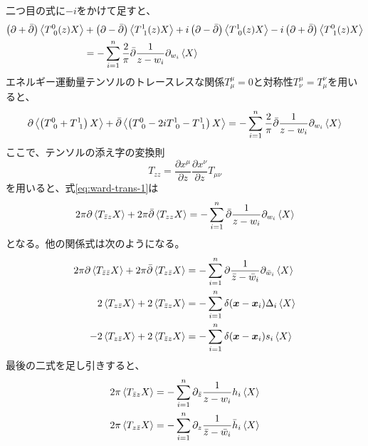 \documentclass[11pt, aps, longbibliography]{article}
\numberwithin{equation}{section}
\begin{document}
        二つ目の式に$-i$をかけて足すと、
        \begin{align}
            \left( \partial + \bar{\partial}\right) \expval{T^0_{\  0}(z)X} &+ \left( \partial - \bar{\partial}\right) \expval{T^1_{\ 1}(z)X} + i\left(  \partial - \bar{\partial}\right)  \expval{T^1_{\  0}(z)X} -i\left(  \partial + \bar{\partial}\right) \expval{T^0_{\  1}(z)X}  \notag \\
            &= -\sum_{i=1}^{n} \frac{2}{\pi} \bar{\partial} \frac{1}{z-w_i} \partial_{w_i} \expval{X}
        \end{align}
        エネルギー運動量テンソルのトレースレスな関係$T^\mu_\mu = 0$と対称性$T^\mu_\nu = T^\nu_\mu$を用いると、
        \begin{equation}\label{eq:ward-trans-1}
            \partial\expval{\left(T^0_{\  0}+T^1_{\  1}\right)X}  + \bar{\partial} \expval{\left(T^0_{\ 0}-2iT^1_{\  0}-T^1_{\ 1}\right)X} = - \sum_{i=1}^{n} \frac{2}{\pi} \bar{\partial} \frac{1}{z-w_i} \partial_{w_i}\expval{X}
        \end{equation}
        ここで、テンソルの添え字の変換則
        \begin{equation}
            T_{zz} = \frac{\partial x^\mu}{\partial z}\frac{\partial x^\nu}{\partial z} T_{\mu\nu}
        \end{equation}
        を用いると、式\eqref{eq:ward-trans-1}は
        \begin{equation}\label{eq:ward-trans-2}
            2\pi \partial \expval{T_{\bar{z}z}X} + 2\pi \bar{\partial} \expval{T_{zz}X} = - \sum_{i=1}^{n} \bar{\partial} \frac{1}{z-w_i} \partial_{w_i} \expval{X}
        \end{equation}
        となる。他の関係式は次のようになる。
        \begin{align}
            2\pi \partial \expval{T_{\bar{z}\bar{z}}X} + 2\pi \bar{\partial} \expval{T_{z\bar{z}}X} &= - \sum_{i=1}^{n} \partial \frac{1}{\bar{z}-\bar{w}_i}  \partial_{\bar{w}_i} \expval{X} \label{eq:ward-trans-3} \\
            2 \expval{T_{z\bar{z}}X} + 2\expval{T_{\bar{z}z}X} &= - \sum_{i=1}^{n} \delta(\bm{x}-\bm{x}_i) \Delta_i \expval{X} \\
            -2 \expval{T_{z\bar{z}}X} + 2\expval{T_{\bar{z}z}X} &= - \sum_{i=1}^{n} \delta(\bm{x}-\bm{x}_i) s_i \expval{X} 
        \end{align}
        最後の二式を足し引きすると、
        \begin{align}
            2\pi \expval{T_{\bar{z}z}X} &= - \sum_{i=1}^{n} \partial_{\bar{z}} \frac{1}{z-w_i} h_i \expval{X} \label{eq:ward-1} \\
            2\pi \expval{T_{z\bar{z}}X} &= - \sum_{i=1}^{n} \partial_{z} \frac{1}{\bar{z}-\bar{w}_i} \bar{h}_i \expval{X} \label{eq:ward-2}
        \end{align}
\end{document}

